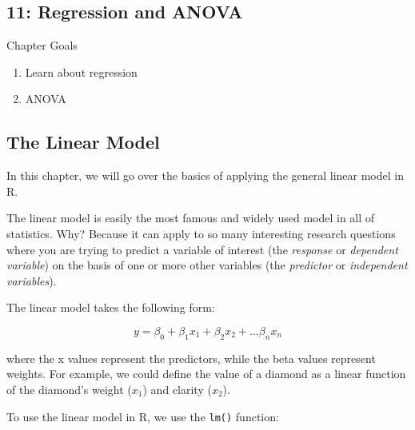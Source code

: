 \documentclass{tufte-book}\usepackage[]{graphicx}\usepackage[]{color}
\newcommand{\newfun}[1]{\begin{LARGE} \begin{center} \texttt{#1} \end{center} \end{LARGE}}
\begin{document}
\begin{footnotesize}

\chapter{11: Regression and ANOVA}
\label{ch:11}


Chapter Goals

\begin{enumerate}
  \item Learn about regression
  \item ANOVA
\end{enumerate}

\section{The Linear Model}

In this chapter, we will go over the basics of applying the general linear model in R.

The linear model is easily the most famous and widely used model in all of statistics. Why? Because it can apply to so many interesting research questions where you are trying to predict a variable of interest (the \textit{response} or \textit{dependent variable}) on the basis of one or more other variables (the \textit{predictor} or \textit{independent variables}).

The linear model takes the following form:

\begin{Large}
\begin{equation*}
y=\beta_{0}+\beta_{1}x_{1}+\beta_{2}x_{2}+...\beta_{n}x_{n}
\end{equation*}
\end{Large}

where the x values represent the predictors, while the beta values represent weights. For example, we could define the value of a diamond as a linear function of the diamond's weight ($x_1$) and clarity ($x_2$).

To use the linear model in R, we use the \texttt{lm()} function:


\vspace{5mm} %
\noindent
\setlength{\fboxrule}{1.5pt}
\fbox{
\parbox{\textwidth}{

\newfun{lm()}\index{lm()}

}}
\end{footnotesize}
\end{document}
